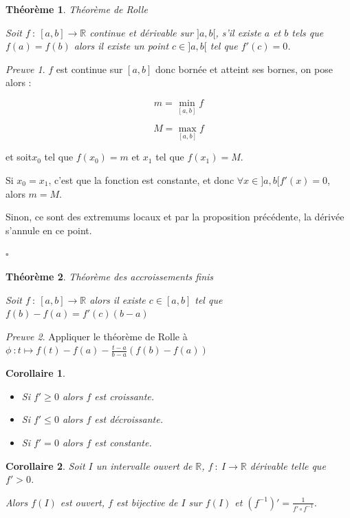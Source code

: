 \documentclass[]{article}
\newtheorem{mythm}{Théorème}
\newtheorem{mycor}{Corollaire}
\theoremstyle{remark}
\newtheorem{myproof}{Preuve}
\theoremstyle{definition}
\newcommand{\cqfd}{
	\hfill$\square$
}
\newcommand{\funcshort}[3]{
#1 ~ : ~ #2 \longrightarrow #3
}
\begin{document}
\begin{mythm}Théorème de Rolle
	
	Soit $\funcshort{f}{[a, b]}{\mathbb{R}}$ continue et dérivable sur $]a, b[$, s'il existe $a$ et $b$ tels que $f(a)=f(b)$ alors il existe un point $c \in ]a, b[$ tel que $f'(c)=0$.
\end{mythm}

\begin{myproof}
	$f$ est continue sur $[a,b]$ donc bornée et atteint ses bornes, on pose alors :
	
	$$m = \min_{[a, b]} f$$
	
	$$M = \max_{[a, b]} f$$
	
	et soit$x_0$ tel que $f(x_0)=m$ et $x_1$ tel que $f(x_1)=M$.
	
	Si $x_0=x_1$, c'est que la fonction est constante, et donc $\forall x \in ]a, b[f'(x)=0$, alors $m=M$.
	
	Sinon, ce sont des extremums locaux et par la proposition précédente, la dérivée s'annule en ce point.
	
	\cqfd
\end{myproof}

\begin{mythm}Théorème des accroissements finis

	Soit $\funcshort{f}{[a, b]}{\mathbb{R}}$ alors il existe $c \in [a, b]$ tel que $f(b)-f(a) = f'(c)(b-a)$
\end{mythm}

\begin{myproof}
	Appliquer le théorème de Rolle à $\phi ~ : t \longmapsto f(t) - f(a) - \frac{t-a}{b-a}(f(b)-f(a))$
\end{myproof}

\begin{mycor}
	\begin{itemize}
		\item Si $f' \geqslant 0$ alors $f$ est croissante.
		\item Si $f' \leqslant 0$ alors $f$ est décroissante. 
		\item Si $f' = 0$ alors $f$ est constante.
	\end{itemize}
\end{mycor}

\begin{mycor}
	Soit $I$ un intervalle ouvert de $\mathbb{R}$, $\funcshort{f}{I}{\mathbb{R}}$ dérivable telle que $f' > 0$.
	
	Alors $f(I)$ est ouvert, $f$ est bijective de $I$ sur $f(I)$ et $(f^{-1})'=\frac{1}{f' \circ f^{-1}}$.
\end{mycor}
\end{document}
